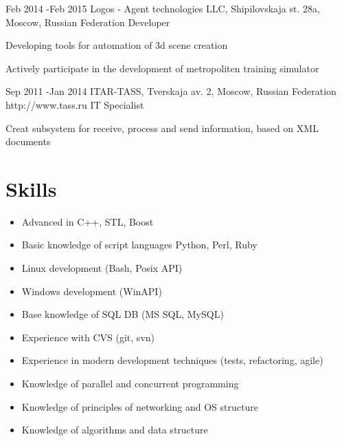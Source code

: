 \documentclass[10pt]{article} %
\begin{document}
\job
{Feb 2014 -}{Feb 2015}
{Logos - Agent technologies LLC, Shipilovskaja st. 28a, Moscow, Russian Federation}
{}
{Developer}
{
\begin{itemize-noindent}
\setlength\itemsep{0em}
\item{Developing tools for automation of 3d scene creation}
\item{Actively participate in the development of metropoliten training simulator}
\end{itemize-noindent}
}


\job
{Sep 2011 -}{Jan 2014}
{ITAR-TASS, Tverskaja av. 2, Moscow, Russian Federation}
{http://www.tass.ru}
{IT Specialist}
{
\begin{itemize-noindent}
\setlength\itemsep{0em}
\item{Creat subsystem for receive, process and send information, based on XML documents}
\end{itemize-noindent}
}


\section{Skills}

\begin{multicols}{2}
\begin{itemize}
\setlength\itemsep{0em}
\item Advanced in C++, STL, Boost
\item Basic knowledge of script languages Python, Perl, Ruby
\item Linux development (Bash, Posix API)
\item Windows development (WinAPI)
\item Base knowledge of SQL DB (MS SQL, MySQL)
\item Experience with CVS (git, svn)
\item Experience in modern development techniques (tests, refactoring, agile)
\item Knowledge of parallel and concurrent programming
\item Knowledge of principles of networking and OS structure
\item Knowledge of algorithms and data structure
\end{itemize}
\end{multicols}
\end{document}
